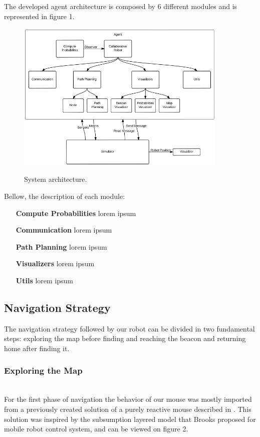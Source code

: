 \documentclass[oribibl]{llncs}
\begin{document}
The developed agent architecture is composed by 6 different modules and is represented in figure 1.

\begin{figure}
  \centering
  \includegraphics[width=0.9\textwidth]{robot-architecture.png}
  \label{fig:layered}
  \caption{System architecture.}
\end{figure}

Bellow, the description of each module:

\begin{itemize}
  \item[\textbf{Compute Probabilities}]
  lorem ipsum
  \item[\textbf{Communication}]
  lorem ipsum
  \item[\textbf{Path Planning}]
  lorem ipsum
  \item[\textbf{Visualizers}]
  lorem ipsum
  \item[\textbf{Utils}]
  lorem ipsum
\end{itemize}

\subsection{Navigation Strategy}
The navigation strategy followed by our robot can be divided in two fundamental steps: exploring the map before finding and reaching the beacon and returning home after finding it.

\subsubsection{Exploring the Map}\hfill \\

For the first phase of navigation the behavior of our mouse was mostly imported from a previously created solution of a purely reactive mouse described in \cite{Moreira2012}. This solution was inspired by the subsumption layered model that Brooks proposed for mobile robot control system\cite{Brooks_1986}, and can be viewed on figure 2.
\end{document}
